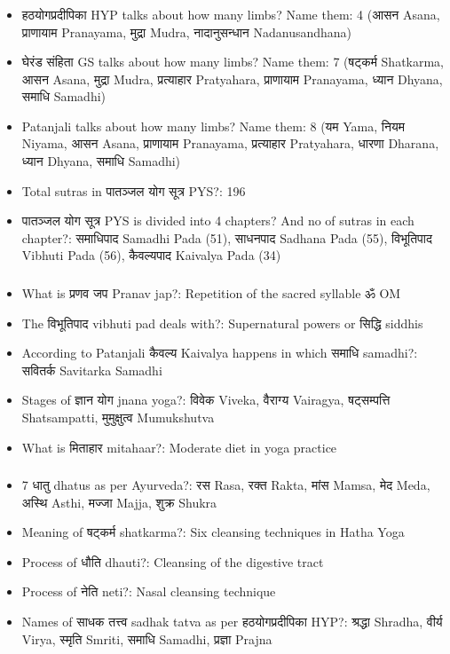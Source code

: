 \begin{frame}[fragile]\frametitle{}
\begin{itemize}
\item हठयोगप्रदीपिका HYP talks about how many limbs? Name them: 4 (आसन Asana, प्राणायाम Pranayama, मुद्रा Mudra, नादानुसन्धान Nadanusandhana)
\item घेरंड संहिता GS talks about how many limbs? Name them: 7 (षट्कर्म Shatkarma, आसन Asana, मुद्रा Mudra, प्रत्याहार Pratyahara, प्राणायाम Pranayama, ध्यान Dhyana, समाधि Samadhi)
\item Patanjali talks about how many limbs? Name them: 8 (यम Yama, नियम Niyama, आसन Asana, प्राणायाम Pranayama, प्रत्याहार Pratyahara, धारणा Dharana, ध्यान Dhyana, समाधि Samadhi)
\item Total sutras in पातञ्जल योग सूत्र PYS?: 196
\item पातञ्जल योग सूत्र PYS is divided into 4 chapters? And no of sutras in each chapter?: समाधिपाद Samadhi Pada (51), साधनपाद Sadhana Pada (55), विभूतिपाद Vibhuti Pada (56), कैवल्यपाद Kaivalya Pada (34)
\end{itemize}
\end{frame}

\begin{frame}[fragile]\frametitle{}
\begin{itemize}
\item What is प्रणव जप Pranav jap?: Repetition of the sacred syllable ॐ OM
\item The विभूतिपाद vibhuti pad deals with?: Supernatural powers or सिद्धि siddhis
\item According to Patanjali कैवल्य Kaivalya happens in which समाधि samadhi?: सवितर्क Savitarka Samadhi
\item Stages of ज्ञान योग jnana yoga?: विवेक Viveka, वैराग्य Vairagya, षट्सम्पत्ति Shatsampatti, मुमुक्षुत्व Mumukshutva
\item What is मिताहार mitahaar?: Moderate diet in yoga practice
\end{itemize}
\end{frame}

\begin{frame}[fragile]\frametitle{}
\begin{itemize}
\item 7 धातु dhatus as per Ayurveda?: रस Rasa, रक्त Rakta, मांस Mamsa, मेद Meda, अस्थि Asthi, मज्जा Majja, शुक्र Shukra
\item Meaning of षट्कर्म shatkarma?: Six cleansing techniques in Hatha Yoga
\item Process of धौति dhauti?: Cleansing of the digestive tract
\item Process of नेति neti?: Nasal cleansing technique
\item Names of साधक तत्त्व sadhak tatva as per हठयोगप्रदीपिका HYP?: श्रद्धा Shradha, वीर्य Virya, स्मृति Smriti, समाधि Samadhi, प्रज्ञा Prajna
\end{itemize}
\end{frame}

